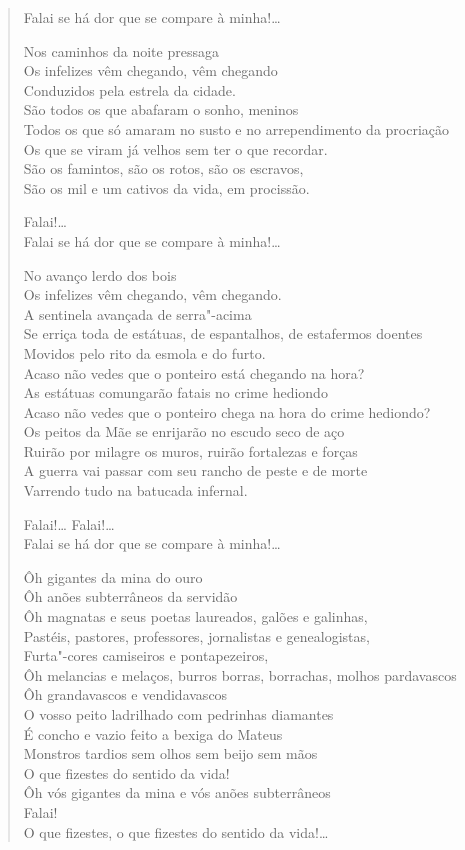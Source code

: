 {\begin{verse}
Falai se há dor que se compare à minha!\ldots{}

Nos caminhos da noite pressaga\\
Os infelizes vêm chegando, vêm chegando\\
Conduzidos pela estrela da cidade.\\
São todos os que abafaram o sonho, meninos\\
Todos os que só amaram no susto e no arrependimento da procriação\\
Os que se viram já velhos sem ter o que recordar.\\
São os famintos, são os rotos, são os escravos,\\
São os mil e um cativos da vida, em procissão.

Falai!\ldots{}\\
Falai se há dor que se compare à minha!\ldots{}

No avanço lerdo dos bois\\
Os infelizes vêm chegando, vêm chegando.\\
A sentinela avançada de serra"-acima\\
Se erriça toda de estátuas, de espantalhos, de estafermos doentes\\
Movidos pelo rito da esmola e do furto.\\
Acaso não vedes que o ponteiro está chegando na hora?\\
As estátuas comungarão fatais no crime hediondo\\
Acaso não vedes que o ponteiro chega na hora do crime hediondo?\\
Os peitos da Mãe se enrijarão no escudo seco de aço\\
Ruirão por milagre os muros, ruirão fortalezas e forças\\
A guerra vai passar com seu rancho de peste e de morte\\
Varrendo tudo na batucada infernal.

Falai!\ldots{} Falai!\ldots{}\\
Falai se há dor que se compare à minha!\ldots{}

Ôh gigantes da mina do ouro\\
Ôh anões subterrâneos da servidão\\
Ôh magnatas e seus poetas laureados, galões e galinhas,\\
Pastéis, pastores, professores, jornalistas e genealogistas,\\
Furta"-cores camiseiros e pontapezeiros,\\
Ôh melancias e melaços, burros borras, borrachas, molhos pardavascos\\
Ôh grandavascos e vendidavascos\\
O vosso peito ladrilhado com pedrinhas diamantes\\
É concho e vazio feito a bexiga do Mateus\\
Monstros tardios sem olhos sem beijo sem mãos\\
O que fizestes do sentido da vida!\\
Ôh vós gigantes da mina e vós anões subterrâneos\\
Falai!\\
O que fizestes, o que fizestes do sentido da vida!\ldots{}


\end{verse}}
